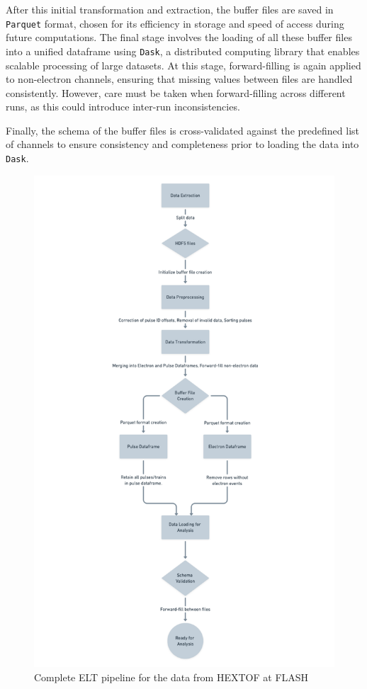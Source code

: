 After this initial transformation and extraction, the buffer files are saved in \texttt{Parquet} format, chosen for its efficiency in storage and speed of access during future computations. The final stage involves the loading of all these buffer files into a unified dataframe using \texttt{Dask}, a distributed computing library that enables scalable processing of large datasets. At this stage, forward-filling is again applied to non-electron channels, ensuring that missing values between files are handled consistently. However, care must be taken when forward-filling across different runs, as this could introduce inter-run inconsistencies.

Finally, the schema of the buffer files is cross-validated against the predefined list of channels to ensure consistency and completeness prior to loading the data into \texttt{Dask}.

\begin{figure}[H]
    \label{fig:elt}
    \centering
    \includegraphics[width=0.7\linewidth]{images/elt_cropped.png}
    \caption{Complete \gls{ELT} pipeline for the data from \gls{HEXTOF} at \gls{FLASH}}
\end{figure}

